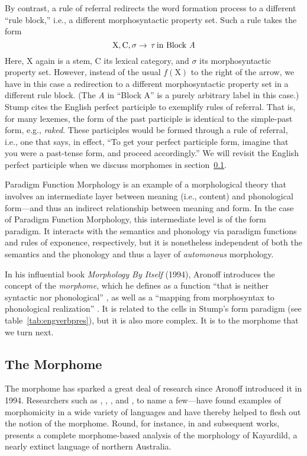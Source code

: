 By contrast, a rule of referral redirects the word formation process to a different ``rule block,'' i.e.,
a different morphosyntactic property set. Such a rule takes the form 
\begin{equation}
\label{eq:ror}
\text{X}, \text{C}, \sigma \to \, \tau \, \text{in Block \textit{A}}
\end{equation}
Here, X again is a stem, 
C its lexical category, and $\sigma$ its morphosyntactic property set. However, instead of the usual $f(\text{X})$ 
to the right of the arrow, we have in this case a redirection to a 
different morphosyntactic property set in a different rule block. (The \textit{A} in ``Block A'' 
is a purely arbitrary label in this case.) Stump cites the English perfect participle 
to exemplify rules of referral. That is, for many lexemes, the form of the 
past participle is identical to the simple-past form, e.g., \textit{raked}. 
These participles would be formed through a rule of referral, i.e., one that 
says, in effect, ``To get your perfect participle form, imagine that you 
were a past-tense form, and proceed accordingly.''  We will revisit the English 
perfect participle when we discuss morphomes 
in section~\ref{sec:the-morphome}.

Paradigm Function Morphology is an example of a morphological theory that involves an intermediate layer between
meaning (i.e., content) and phonological form---and thus an indirect relationship between
meaning and form. In the case of Paradigm Function Morphology, this intermediate
level is of the form paradigm. It interacts with the semantics and phonology 
via paradigm functions and rules of exponence, respectively,
but it is nonetheless independent of both the semantics and the phonology and thus a layer of \emph{automonous} morphology.  

In his influential book \textit{Morphology By Itself} (1994), Aronoff 
introduces the concept of the \emph{morphome}, which he
defines as a function ``that is neither 
syntactic nor phonological'' \cite[][p. 25]{aronoff:1994},
as well as a
``mapping from morphosyntax to phonological realization'' \citep[][p. 25]{aronoff:1994}. 
It is related
to the cells in Stump's form paradigm (see table~\ref{tab:engverbpres}), 
but it is also more complex. It is to the morphome that we turn next.

\subsection{The Morphome}
\label{sec:the-morphome}
The morphome has sparked a 
great deal of research since Aronoff introduced it in 1994. Researchers
such as \cite{maiden:2005, maiden:md:2016}, \cite{round:2009, round:2011, 
round:2012, round:2015, round:md:2016}, \cite{oneill:2014b,oneill:2018}, and \cite{bonami:2008, bonami:2010}, to name 
a few---have found examples of morphomicity in a wide variety of 
languages and have thereby helped to flesh out the notion of the morphome.
Round, for instance, in \cite{round:2009} and subsequent works, 
presents a complete morphome-based analysis of the morphology of 
Kayardild, a nearly extinct language of northern Australia. 

